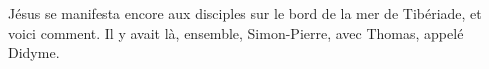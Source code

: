 \encetemps
	Jésus se manifesta encore aux disciples sur le bord de la mer de Tibériade,
	et voici comment.
Il y avait là, ensemble, Simon-Pierre, avec Thomas, appelé Didyme.

